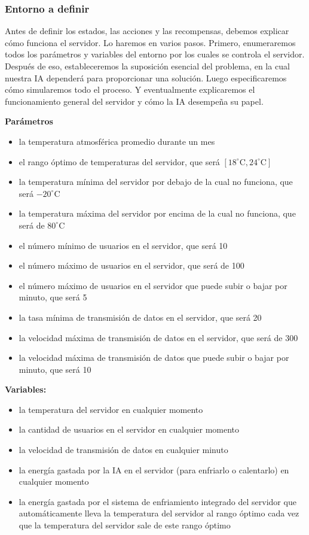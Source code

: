 \documentclass[]{book}
\providecommand{\tightlist}{%
  \setlength{\itemsep}{0pt}\setlength{\parskip}{0pt}}
\begin{document}
\hypertarget{entorno-a-definir-1}{%
\subsubsection{Entorno a definir}\label{entorno-a-definir-1}}

Antes de definir los estados, las acciones y las recompensas, debemos explicar cómo funciona el servidor. Lo haremos en varios pasos. Primero, enumeraremos todos los parámetros y variables del entorno por los cuales se controla el servidor. Después de eso, estableceremos la suposición esencial del problema, en la cual nuestra IA dependerá para proporcionar una solución. Luego especificaremos cómo simularemos todo el proceso. Y eventualmente explicaremos el funcionamiento general del servidor y cómo la IA desempeña su papel.

\textbf{Parámetros}

\begin{itemize}
\tightlist
\item
  la temperatura atmosférica promedio durante un mes
\item
  el rango óptimo de temperaturas del servidor, que será \([18^{\circ} \textrm{C}, 24^{\circ} \textrm{C}]\)
\item
  la temperatura mínima del servidor por debajo de la cual no funciona, que será \(-20^{\circ} \textrm {C}\)
\item
  la temperatura máxima del servidor por encima de la cual no funciona, que será de \(80^{\circ} \textrm {C}\)
\item
  el número mínimo de usuarios en el servidor, que será 10
\item
  el número máximo de usuarios en el servidor, que será de 100
\item
  el número máximo de usuarios en el servidor que puede subir o bajar por minuto, que será 5
\item
  la tasa mínima de transmisión de datos en el servidor, que será 20
\item
  la velocidad máxima de transmisión de datos en el servidor, que será de 300
\item
  la velocidad máxima de transmisión de datos que puede subir o bajar por minuto, que será 10
\end{itemize}

\textbf{Variables:}

\begin{itemize}
\tightlist
\item
  la temperatura del servidor en cualquier momento
\item
  la cantidad de usuarios en el servidor en cualquier momento
\item
  la velocidad de transmisión de datos en cualquier minuto
\item
  la energía gastada por la IA en el servidor (para enfriarlo o calentarlo) en cualquier momento
\item
  la energía gastada por el sistema de enfriamiento integrado del servidor que automáticamente lleva la temperatura del servidor al rango óptimo cada vez que la temperatura del servidor sale de este rango óptimo
\end{itemize}
\end{document}
